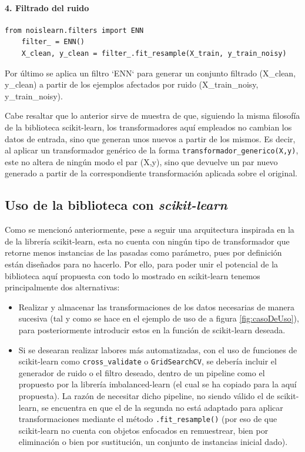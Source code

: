 \documentclass[print, color]{ugrTFG}
\begin{document}
 \paragraph{4. Filtrado del ruido}
 \begin{lstlisting}[style=mystyle]
    from noislearn.filters import ENN
    filter_ = ENN()
    X_clean, y_clean = filter_.fit_resample(X_train, y_train_noisy)
 \end{lstlisting}
 Por último se aplica un filtro `ENN` para generar un conjunto filtrado (X\_clean, y\_clean) a partir de los ejemplos afectados por ruido (X\_train\_noisy, y\_train\_noisy).

 Cabe resaltar que lo anterior sirve de muestra de que, siguiendo la misma filosofía de la biblioteca scikit-learn, los transformadores aquí empleados no cambian los datos de entrada, sino que generan unos nuevos a partir de los mismos. Es decir, al aplicar un transformador genérico de la forma \texttt{transformador\_generico(X,y)}, este no altera de ningún modo el par (X,y), sino que devuelve un par nuevo generado a partir de la correspondiente transformación aplicada sobre el original.


 \subsection{Uso de la biblioteca con \textit{scikit-learn}}
 Como se mencionó anteriormente, pese a seguir una arquitectura inspirada en la de la librería scikit-learn, esta no cuenta con ningún tipo de transformador que retorne menos instancias de las pasadas como parámetro, pues por definición están diseñados para no hacerlo. Por ello, para poder unir el potencial de la biblioteca aquí propuesta con todo lo mostrado en scikit-learn tenemos principalmente dos alternativas:
 \begin{itemize}
     
     \item Realizar y almacenar las transformaciones de los datos necesarias de manera sucesiva (tal y como se hace en el ejemplo de uso de a figura \ref{fig:casoDeUso}), para posteriormente introducir estos en la función de scikit-learn deseada.
     
     \item Si se desearan realizar labores más automatizadas, con el uso de funciones de scikit-learn como \texttt{cross\_validate} o \texttt{GridSearchCV}, se debería incluir el generador de ruido o el filtro deseado, dentro de un pipeline como el propuesto por la librería imbalanced-learn (el cual se ha copiado para la aquí propuesta). La razón de necesitar dicho pipeline, no siendo válido el de scikit-learn, se encuentra en que el de la segunda no está adaptado para aplicar transformaciones mediante el método \texttt{.fit\_resample()} (por eso de que scikit-learn no cuenta con objetos enfocados en remuestrear, bien por eliminación o bien por sustitución, un conjunto de instancias inicial dado).  
     
 \end{itemize}
\end{document}
